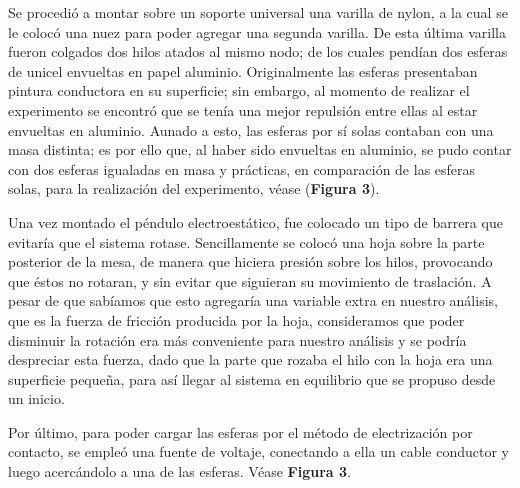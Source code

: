 \documentclass[letterpaper, 11 pt]{article}
\begin{document}
\begin{multicols*}{2}
Se procedió a montar sobre un soporte universal una varilla de nylon, a la cual se le colocó una nuez para poder agregar una segunda varilla. De esta última varilla fueron colgados dos hilos atados al mismo nodo; de los cuales pendían dos esferas de unicel envueltas en papel aluminio.
Originalmente las esferas presentaban pintura conductora en su superficie; sin embargo, al momento de realizar el experimento se encontró que se tenía una mejor repulsión entre ellas al estar envueltas en aluminio. Aunado a esto, las esferas por sí solas contaban con una masa distinta; es por ello que, al haber sido envueltas en aluminio, se pudo contar con dos esferas igualadas en masa y prácticas, en comparación de las esferas solas, para la realización del experimento, véase (\textbf{Figura 3}).
 
Una vez montado el péndulo electroestático, fue colocado un tipo de barrera que evitaría que el sistema rotase. Sencillamente se colocó una hoja sobre la parte posterior de la mesa, de manera que hiciera presión sobre los hilos, provocando que éstos no rotaran, y sin evitar que siguieran su movimiento de traslación. A pesar de que sabíamos que esto agregaría una variable extra en nuestro análisis, que es la fuerza de fricción producida por la hoja, consideramos que poder disminuir la rotación era más conveniente para nuestro análisis y se podría despreciar esta fuerza, dado que la parte que rozaba el hilo con la hoja era una superficie pequeña, para así llegar al sistema en equilibrio que se propuso desde un inicio. 

Por último, para poder cargar las esferas por el método de electrización por contacto, se empleó una fuente de voltaje, conectando a ella un cable conductor y luego acercándolo a una de las esferas. Véase \textbf{Figura 3}.



\end{multicols*}
\end{document}
